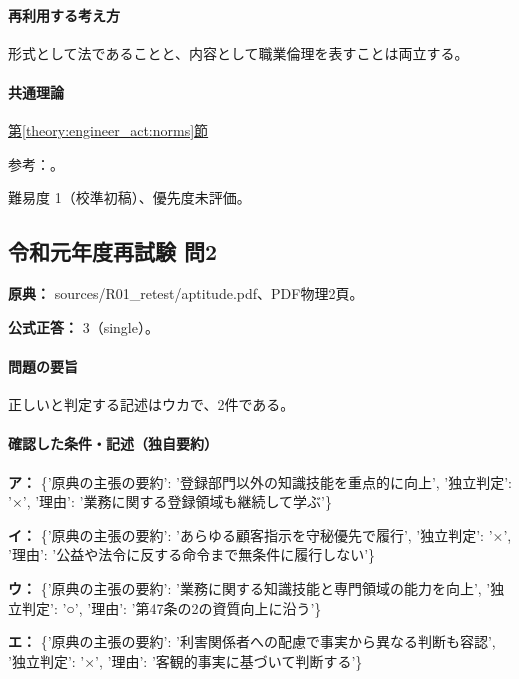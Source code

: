 \paragraph{再利用する考え方} 形式として法であることと、内容として職業倫理を表すことは両立する。

\paragraph{共通理論} \hyperref[theory:engineer_act:norms]{第\ref*{theory:engineer_act:norms}節}

\par 参考：\cite{engineer_act_current}。

\par 難易度 1（校準初稿）、優先度未評価。

\subsection{令和元年度再試験 問2}
\label{q:r01-ret-apt-02}

\noindent\textbf{原典：} sources/R01\_retest/aptitude.pdf、PDF物理2頁。

\textbf{公式正答：} 3（single）。

\paragraph{問題の要旨} 正しいと判定する記述はウカで、2件である。

\paragraph{確認した条件・記述（独自要約）}\mbox{}\par

\noindent\textbf{ア：} \{'原典の主張の要約': '登録部門以外の知識技能を重点的に向上', '独立判定': '×', '理由': '業務に関する登録領域も継続して学ぶ'\}\par

\noindent\textbf{イ：} \{'原典の主張の要約': 'あらゆる顧客指示を守秘優先で履行', '独立判定': '×', '理由': '公益や法令に反する命令まで無条件に履行しない'\}\par

\noindent\textbf{ウ：} \{'原典の主張の要約': '業務に関する知識技能と専門領域の能力を向上', '独立判定': '○', '理由': '第47条の2の資質向上に沿う'\}\par

\noindent\textbf{エ：} \{'原典の主張の要約': '利害関係者への配慮で事実から異なる判断も容認', '独立判定': '×', '理由': '客観的事実に基づいて判断する'\}\par

